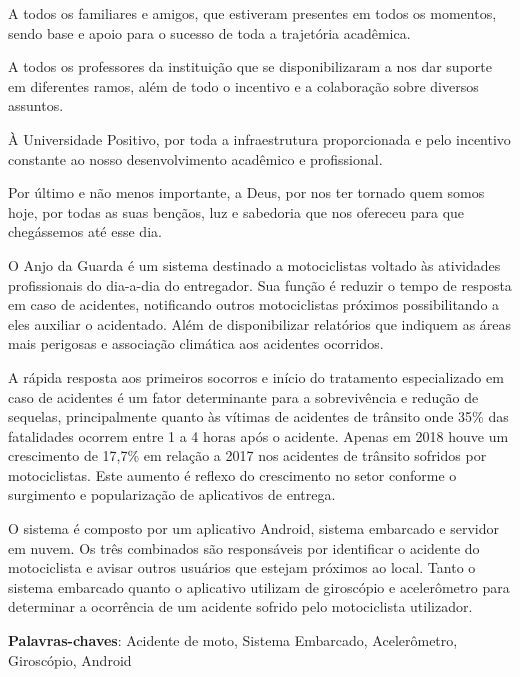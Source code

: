 \documentclass{utfpr-pg}
\begin{document}
\frenchspacing

\imprimircapa
\imprimirfolhaderosto








\begin{agradecimentos}
    A todos os familiares e amigos, que estiveram presentes em todos os momentos, sendo base e apoio para o sucesso de toda a trajetória acadêmica.
    
    A todos os professores da instituição que se disponibilizaram a nos dar suporte em diferentes ramos, além de todo o incentivo e a colaboração sobre diversos assuntos.
  
    À Universidade Positivo, por toda a infraestrutura proporcionada e pelo incentivo constante ao nosso desenvolvimento acadêmico e profissional.
    
    Por último e não menos importante, a Deus, por nos ter tornado quem somos hoje, por todas as suas bençãos, luz e sabedoria que nos ofereceu para que chegássemos até esse dia.

    
\end{agradecimentos}
 
 \begin{resumo}
 
O Anjo da Guarda é um sistema destinado a motociclistas voltado às atividades profissionais do dia-a-dia do entregador. Sua função é reduzir o tempo de resposta em caso de acidentes, notificando outros motociclistas próximos possibilitando a eles auxiliar o acidentado. Além de disponibilizar relatórios que indiquem as áreas mais perigosas e associação climática aos acidentes ocorridos.

A rápida resposta aos primeiros socorros e início do tratamento especializado em caso de acidentes é um fator determinante para a sobrevivência e redução de sequelas, principalmente quanto às vítimas de acidentes de trânsito onde 35\% das fatalidades ocorrem entre 1 a 4 horas após o acidente. Apenas em 2018 houve um crescimento de 17,7\% em relação a 2017 nos acidentes de trânsito sofridos por motociclistas. Este aumento é reflexo do crescimento no setor conforme o surgimento e popularização de aplicativos de entrega.

O sistema é composto por um aplicativo Android, sistema embarcado e servidor em nuvem. Os três combinados são responsáveis por identificar o acidente do motociclista e avisar outros usuários que estejam próximos ao local. Tanto o sistema embarcado quanto o aplicativo utilizam de giroscópio e acelerômetro para determinar a ocorrência de um acidente sofrido pelo motociclista utilizador.




\textbf{Palavras-chaves}:  Acidente de moto, Sistema Embarcado, Acelerômetro, Giroscópio, Android
 
 \end{resumo}
 
\end{document}
